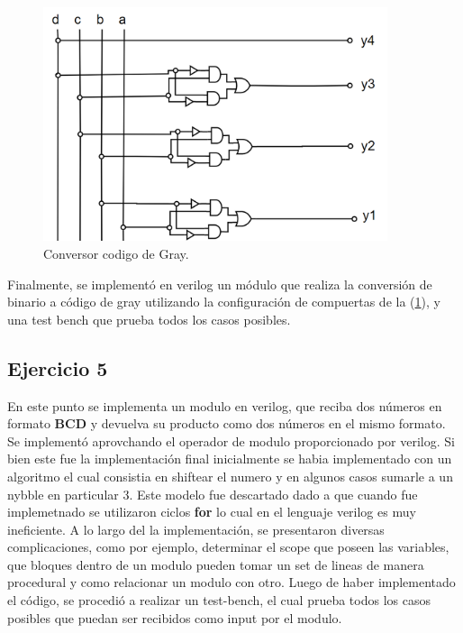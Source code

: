 \documentclass[a4paper]{article}
\begin{document}
\begin{figure}[H]
	\centering
	\includegraphics[width=0.9\textwidth]{Circuito3.png}
	\caption{Conversor codigo de Gray.}
	\label{fig:circ3}
\end{figure}
Finalmente, se implementó en verilog un módulo que realiza la conversión de binario a código de gray utilizando la configuración de compuertas de la (\ref{fig:circ3}),
y una test bench que prueba todos los casos posibles.


\subsection*{Ejercicio 5}

En este punto se implementa un modulo en verilog, que reciba dos números en formato \textbf{BCD} y devuelva su producto como dos números en el mismo formato. Se implementó aprovchando el operador de modulo proporcionado por verilog.  Si bien este fue la implementación final inicialmente se habia implementado con un algoritmo el cual consistia en shiftear el numero y en algunos casos sumarle a un nybble en particular 3. Este modelo fue descartado dado a que cuando fue implemetnado se utilizaron ciclos \textbf{for}  lo cual en el lenguaje verilog es muy ineficiente.
A lo largo del la implementación, se presentaron diversas complicaciones, como por ejemplo, determinar el scope que poseen las variables, que bloques dentro de un modulo pueden tomar un set de lineas de manera procedural y como relacionar un modulo con otro.
Luego de haber implementado el código, se procedió a realizar un test-bench, el cual prueba todos los casos posibles que puedan ser recibidos como input por el modulo.
\end{document}
